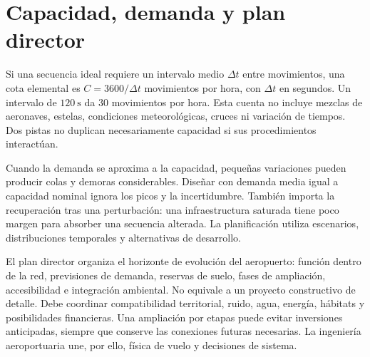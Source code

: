 \section{Capacidad, demanda y plan director}
Si una secuencia ideal requiere un intervalo medio $\Delta t$ entre movimientos, una cota elemental es $C=3600/\Delta t$ movimientos por hora, con $\Delta t$ en segundos. Un intervalo de $120\ \mathrm s$ da $30$ movimientos por hora. Esta cuenta no incluye mezclas de aeronaves, estelas, condiciones meteorológicas, cruces ni variación de tiempos. Dos pistas no duplican necesariamente capacidad si sus procedimientos interactúan.

Cuando la demanda se aproxima a la capacidad, pequeñas variaciones pueden producir colas y demoras considerables. Diseñar con demanda media igual a capacidad nominal ignora los picos y la incertidumbre. También importa la recuperación tras una perturbación: una infraestructura saturada tiene poco margen para absorber una secuencia alterada. La planificación utiliza escenarios, distribuciones temporales y alternativas de desarrollo.

El plan director organiza el horizonte de evolución del aeropuerto: función dentro de la red, previsiones de demanda, reservas de suelo, fases de ampliación, accesibilidad e integración ambiental. No equivale a un proyecto constructivo de detalle. Debe coordinar compatibilidad territorial, ruido, agua, energía, hábitats y posibilidades financieras. Una ampliación por etapas puede evitar inversiones anticipadas, siempre que conserve las conexiones futuras necesarias. La ingeniería aeroportuaria une, por ello, física de vuelo y decisiones de sistema.

